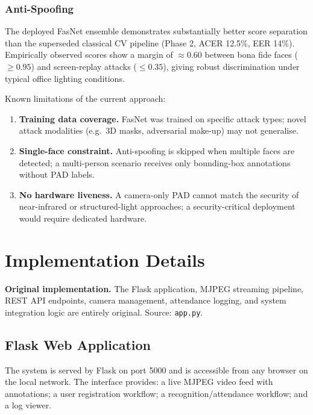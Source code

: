 \documentclass[11pt,a4paper]{article}
\begin{document}
\subsubsection{Anti-Spoofing}
The deployed FasNet ensemble demonstrates substantially better score separation
than the superseded classical CV pipeline (Phase 2, ACER 12.5\%, EER 14\%).
Empirically observed scores show a margin of $\approx 0.60$ between bona fide
faces ($\geq 0.95$) and screen-replay attacks ($\leq 0.35$), giving robust
discrimination under typical office lighting conditions.

Known limitations of the current approach:

\begin{enumerate}[label=\arabic*.]
  \item \textbf{Training data coverage.}
    FasNet was trained on specific attack types; novel attack modalities
    (e.g.\ 3D masks, adversarial make-up) may not generalise.
  \item \textbf{Single-face constraint.}
    Anti-spoofing is skipped when multiple faces are detected; a multi-person
    scenario receives only bounding-box annotations without PAD labels.
  \item \textbf{No hardware liveness.}
    A camera-only PAD cannot match the security of near-infrared or structured-light
    approaches; a security-critical deployment would require dedicated hardware.
\end{enumerate}

\section{Implementation Details}
\label{sec:implementation}

\begin{originalbox}
  \textbf{Original implementation.}
  The Flask application, MJPEG streaming pipeline, REST API endpoints,
  camera management, attendance logging, and system integration logic are
  entirely original.
  Source: \texttt{app.py}.
\end{originalbox}

\subsection{Flask Web Application}

The system is served by Flask on port 5000 and is accessible from any browser
on the local network.
The interface provides: a live MJPEG video feed with annotations; a user
registration workflow; a recognition/attendance workflow; and a log viewer.
\end{document}
